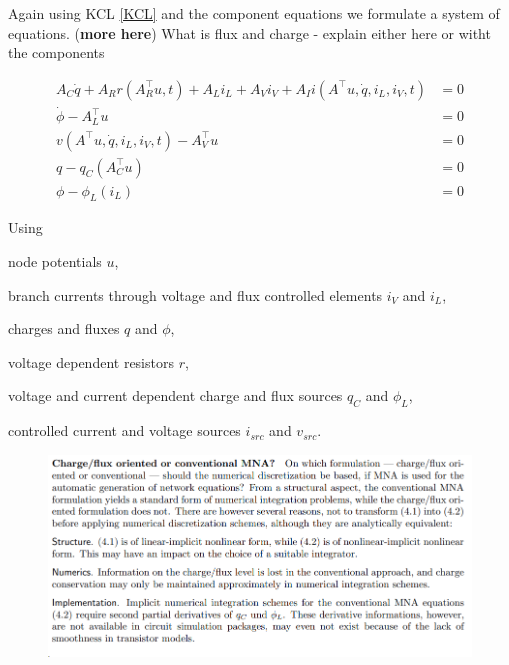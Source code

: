 Again using KCL \ref{KCL} and the component equations we formulate a system of equations. (\textbf{more here}) What is flux and charge - explain either here or witht the components

\begin{align}
	A_C\dot{q} + A_R r(A_R^\top u,t) + A_L i_L + A_V i_V + A_I i(A^\top u, \dot{q}, i_L, i_V, t) &= 0 \label{charge/flux-1} \\
	\dot{\phi} - A_L^\top u &= 0 \label{charge/flux-2} \\
	v(A^\top u, \dot{q}, i_L, i_V, t) - A_V^\top u &= 0 \label{charge/flux-3} \\
	q - q_C(A_C^\top u) &= 0 \label{charge/flux-4} \\
	\phi - \phi_L(i_L) &= 0  \label{charge/flux-5} 
\end{align}

Using
\begin{description}
	\item node potentials $u$,
	\item branch currents through voltage and flux controlled elements $i_V$ and $i_L$,
	\item charges and fluxes $q$ and $\phi$,
	\item voltage dependent resistors $r$,
	\item voltage and current dependent charge and flux sources $q_C$ and $\phi_L$,
	\item controlled current and voltage sources $i_{src}$ and $v_{src}$.
\end{description} 

\begin{figure}[H]
	\centering
	\includegraphics[width=0.7\linewidth]{screenshot007}
	\caption{}
	\label{fig:screenshot007}
\end{figure}
